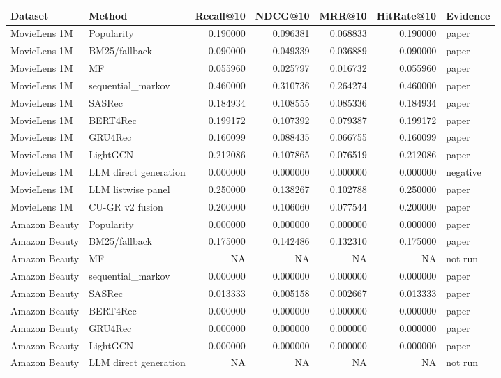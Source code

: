 \begin{tabular}{llrrrrl}
\toprule
Dataset & Method & Recall@10 & NDCG@10 & MRR@10 & HitRate@10 & Evidence \\
\midrule
MovieLens 1M & Popularity & 0.190000 & 0.096381 & 0.068833 & 0.190000 & paper \\
MovieLens 1M & BM25/fallback & 0.090000 & 0.049339 & 0.036889 & 0.090000 & paper \\
MovieLens 1M & MF & 0.055960 & 0.025797 & 0.016732 & 0.055960 & paper \\
MovieLens 1M & sequential\_markov & 0.460000 & 0.310736 & 0.264274 & 0.460000 & paper \\
MovieLens 1M & SASRec & 0.184934 & 0.108555 & 0.085336 & 0.184934 & paper \\
MovieLens 1M & BERT4Rec & 0.199172 & 0.107392 & 0.079387 & 0.199172 & paper \\
MovieLens 1M & GRU4Rec & 0.160099 & 0.088435 & 0.066755 & 0.160099 & paper \\
MovieLens 1M & LightGCN & 0.212086 & 0.107865 & 0.076519 & 0.212086 & paper \\
MovieLens 1M & LLM direct generation & 0.000000 & 0.000000 & 0.000000 & 0.000000 & negative \\
MovieLens 1M & LLM listwise panel & 0.250000 & 0.138267 & 0.102788 & 0.250000 & paper \\
MovieLens 1M & CU-GR v2 fusion & 0.200000 & 0.106060 & 0.077544 & 0.200000 & paper \\
Amazon Beauty & Popularity & 0.000000 & 0.000000 & 0.000000 & 0.000000 & paper \\
Amazon Beauty & BM25/fallback & 0.175000 & 0.142486 & 0.132310 & 0.175000 & paper \\
Amazon Beauty & MF & NA & NA & NA & NA & not run \\
Amazon Beauty & sequential\_markov & 0.000000 & 0.000000 & 0.000000 & 0.000000 & paper \\
Amazon Beauty & SASRec & 0.013333 & 0.005158 & 0.002667 & 0.013333 & paper \\
Amazon Beauty & BERT4Rec & 0.000000 & 0.000000 & 0.000000 & 0.000000 & paper \\
Amazon Beauty & GRU4Rec & 0.000000 & 0.000000 & 0.000000 & 0.000000 & paper \\
Amazon Beauty & LightGCN & 0.000000 & 0.000000 & 0.000000 & 0.000000 & paper \\
Amazon Beauty & LLM direct generation & NA & NA & NA & NA & not run \\

\end{tabular}
